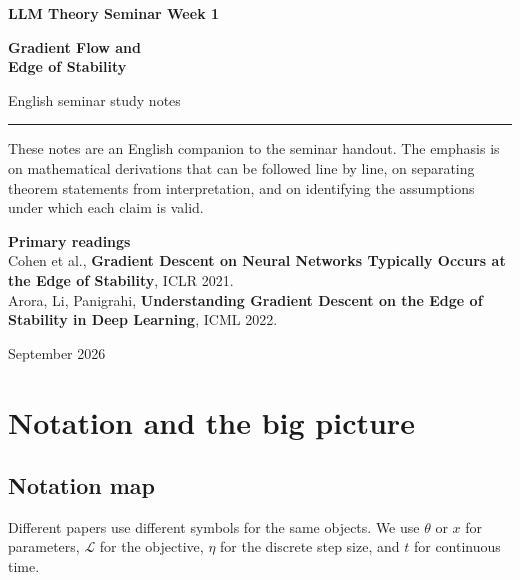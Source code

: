 \documentclass[11pt,a4paper,oneside,openany]{memoir}
\theoremstyle{definition}
\begin{document}
\begin{titlingpage}
\thispagestyle{empty}
\vspace*{1.2cm}
{\small\bfseries LLM Theory Seminar \hfill Week 1\par}
\vspace{1.4cm}
{\HUGE\bfseries Gradient Flow and\\[0.18em]Edge of Stability\par}
\vspace{0.55cm}
{\large English seminar study notes\par}
\vspace{0.9cm}
\rule{\textwidth}{0.7pt}
\vspace{1.1cm}
\begin{minipage}{0.86\textwidth}
\small
These notes are an English companion to the seminar handout.  The emphasis is on
mathematical derivations that can be followed line by line, on separating theorem
statements from interpretation, and on identifying the assumptions under which each
claim is valid.
\end{minipage}
\vfill
{\small\textbf{Primary readings}\\[0.25em]
Cohen et al., \textbf{Gradient Descent on Neural Networks Typically Occurs at the Edge of Stability}, ICLR 2021.\\Arora, Li, Panigrahi, \textbf{Understanding Gradient Descent on the Edge of Stability in Deep Learning}, ICML 2022.
\par}
\vspace{0.8cm}
{\small September 2026\par}
\end{titlingpage}
\tableofcontents*
\clearpage

\chapter{Notation and the big picture}

\section{Notation map}
Different papers use different symbols for the same objects.  We use $\theta$ or $x$ for parameters, $\mathcal L$ for the objective, $\eta$ for the discrete step size, and $t$ for continuous time.
\end{document}
